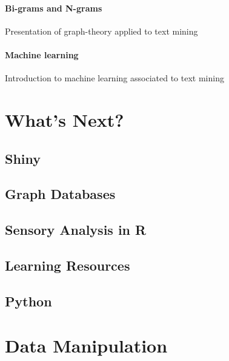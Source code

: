\documentclass[
]{book}
\begin{document}
\hypertarget{bi-grams-and-n-grams}{%
\subsubsection{Bi-grams and N-grams}\label{bi-grams-and-n-grams}}

Presentation of graph-theory applied to text mining

\hypertarget{machine-learning}{%
\subsubsection{Machine learning}\label{machine-learning}}

Introduction to machine learning associated to text mining

\hypertarget{next-steps}{%
\chapter{What's Next?}\label{next-steps}}

\hypertarget{shiny-2}{%
\section{Shiny}\label{shiny-2}}

\hypertarget{graph-databases}{%
\section{Graph Databases}\label{graph-databases}}

\hypertarget{sensory-analysis-in-r}{%
\section{Sensory Analysis in R}\label{sensory-analysis-in-r}}

\hypertarget{learning-resources}{%
\section{Learning Resources}\label{learning-resources}}

\hypertarget{python}{%
\section{Python}\label{python}}

\hypertarget{appendix-appendix}{%
\appendix}


\hypertarget{data_manip}{%
\chapter{Data Manipulation}\label{data_manip}}
\end{document}
